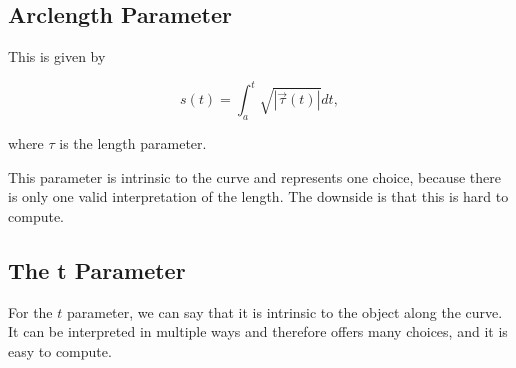 \subsection{Arclength Parameter}

This is given by

\[
    s(t) = \int_{a}^{t} \sqrt{|\vec{\tau}(t)|} dt,
\]

where \(\tau\) is the length parameter.

This parameter is intrinsic to the curve and represents one choice, because there is only one valid
interpretation of the length. The downside is that this is hard to compute.

\subsection{The t Parameter}

For the \(t\) parameter, we can say that it is intrinsic to the object along the curve. It can be
interpreted in multiple ways and therefore offers many choices, and it is easy to compute.


